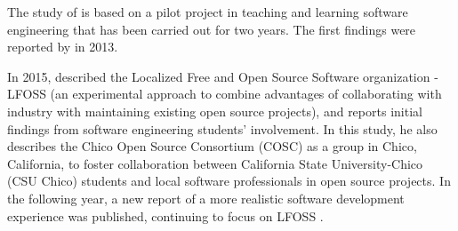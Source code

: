 The study of \citeauthor{id4815} is based on a pilot project in teaching and learning software engineering that has been carried out for two years. 
The first findings were reported by \citeauthor{id5546} in 2013.

In 2015, \citeauthor{id1088} described the Localized Free and Open Source Software organization - LFOSS (an
experimental approach to combine advantages of collaborating
with industry with maintaining existing open source projects), and reports initial findings from software engineering students' involvement. In this study, he also describes the Chico Open Source Consortium (COSC) as a group in Chico, California, to foster collaboration between California State University-Chico (CSU Chico) students and local software professionals in open source projects. In the following year, a new report of a more realistic software development experience was published, continuing to focus on LFOSS \cite{id4663}.
